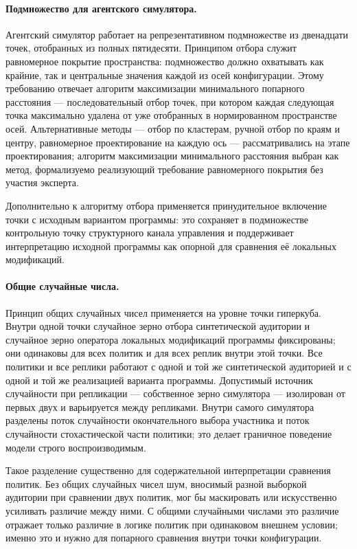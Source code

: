 \paragraph{Подмножество для агентского симулятора.}
Агентский симулятор работает на репрезентативном подмножестве из двенадцати точек, отобранных из полных пятидесяти. Принципом отбора служит равномерное покрытие пространства: подмножество должно охватывать как крайние, так и центральные значения каждой из осей конфигурации. Этому требованию отвечает алгоритм максимизации минимального попарного расстояния --- последовательный отбор точек, при котором каждая следующая точка максимально удалена от уже отобранных в нормированном пространстве осей. Альтернативные методы --- отбор по кластерам, ручной отбор по краям и центру, равномерное проектирование на каждую ось --- рассматривались на этапе проектирования; алгоритм максимизации минимального расстояния выбран как метод, формализуемо реализующий требование равномерного покрытия без участия эксперта.

Дополнительно к алгоритму отбора применяется принудительное включение точки с исходным вариантом программы: это сохраняет в подмножестве контрольную точку структурного канала управления и поддерживает интерпретацию исходной программы как опорной для сравнения её локальных модификаций.

\paragraph{Общие случайные числа.}
Принцип общих случайных чисел применяется на уровне точки гиперкуба. Внутри одной точки случайное зерно отбора синтетической аудитории и случайное зерно оператора локальных модификаций программы фиксированы; они одинаковы для всех политик и для всех реплик внутри этой точки. Все политики и все реплики работают с одной и той же синтетической аудиторией и с одной и той же реализацией варианта программы. Допустимый источник случайности при репликации --- собственное зерно симулятора --- изолирован от первых двух и варьируется между репликами. Внутри самого симулятора разделены поток случайности окончательного выбора участника и поток случайности стохастической части политики; это делает граничное поведение модели строго воспроизводимым.

Такое разделение существенно для содержательной интерпретации сравнения политик. Без общих случайных чисел шум, вносимый разной выборкой аудитории при сравнении двух политик, мог бы маскировать или искусственно усиливать различие между ними. С общими случайными числами это различие отражает только различие в логике политик при одинаковом внешнем условии; именно это и нужно для попарного сравнения внутри точки конфигурации.

